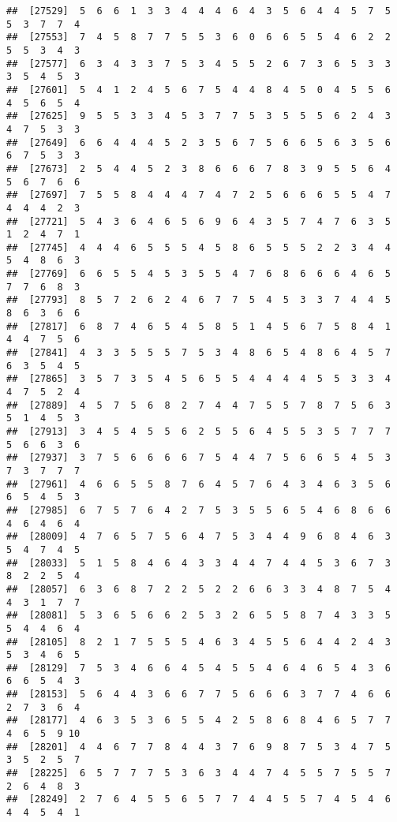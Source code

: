\documentclass[
]{book}
\begin{document}
\begin{verbatim}
##  [27529]  5  6  6  1  3  3  4  4  4  6  4  3  5  6  4  4  5  7  5  5  3  7  7  4
##  [27553]  7  4  5  8  7  7  5  5  3  6  0  6  6  5  5  4  6  2  2  5  5  3  4  3
##  [27577]  6  3  4  3  3  7  5  3  4  5  5  2  6  7  3  6  5  3  3  3  5  4  5  3
##  [27601]  5  4  1  2  4  5  6  7  5  4  4  8  4  5  0  4  5  5  6  4  5  6  5  4
##  [27625]  9  5  5  3  3  4  5  3  7  7  5  3  5  5  5  6  2  4  3  4  7  5  3  3
##  [27649]  6  6  4  4  4  5  2  3  5  6  7  5  6  6  5  6  3  5  6  6  7  5  3  3
##  [27673]  2  5  4  4  5  2  3  8  6  6  6  7  8  3  9  5  5  6  4  5  6  7  6  6
##  [27697]  7  5  5  8  4  4  4  7  4  7  2  5  6  6  6  5  5  4  7  4  4  4  2  3
##  [27721]  5  4  3  6  4  6  5  6  9  6  4  3  5  7  4  7  6  3  5  1  2  4  7  1
##  [27745]  4  4  4  6  5  5  5  4  5  8  6  5  5  5  2  2  3  4  4  5  4  8  6  3
##  [27769]  6  6  5  5  4  5  3  5  5  4  7  6  8  6  6  6  4  6  5  7  7  6  8  3
##  [27793]  8  5  7  2  6  2  4  6  7  7  5  4  5  3  3  7  4  4  5  8  6  3  6  6
##  [27817]  6  8  7  4  6  5  4  5  8  5  1  4  5  6  7  5  8  4  1  4  4  7  5  6
##  [27841]  4  3  3  5  5  5  7  5  3  4  8  6  5  4  8  6  4  5  7  6  3  5  4  5
##  [27865]  3  5  7  3  5  4  5  6  5  5  4  4  4  4  5  5  3  3  4  4  7  5  2  4
##  [27889]  4  5  7  5  6  8  2  7  4  4  7  5  5  7  8  7  5  6  3  5  1  4  5  3
##  [27913]  3  4  5  4  5  5  6  2  5  5  6  4  5  5  3  5  7  7  7  5  6  6  3  6
##  [27937]  3  7  5  6  6  6  6  7  5  4  4  7  5  6  6  5  4  5  3  7  3  7  7  7
##  [27961]  4  6  6  5  5  8  7  6  4  5  7  6  4  3  4  6  3  5  6  6  5  4  5  3
##  [27985]  6  7  5  7  6  4  2  7  5  3  5  5  6  5  4  6  8  6  6  4  6  4  6  4
##  [28009]  4  7  6  5  7  5  6  4  7  5  3  4  4  9  6  8  4  6  3  5  4  7  4  5
##  [28033]  5  1  5  8  4  6  4  3  3  4  4  7  4  4  5  3  6  7  3  8  2  2  5  4
##  [28057]  6  3  6  8  7  2  2  5  2  2  6  6  3  3  4  8  7  5  4  4  3  1  7  7
##  [28081]  5  3  6  5  6  6  2  5  3  2  6  5  5  8  7  4  3  3  5  5  4  4  6  4
##  [28105]  8  2  1  7  5  5  5  4  6  3  4  5  5  6  4  4  2  4  3  5  3  4  6  5
##  [28129]  7  5  3  4  6  6  4  5  4  5  5  4  6  4  6  5  4  3  6  6  6  5  4  3
##  [28153]  5  6  4  4  3  6  6  7  7  5  6  6  6  3  7  7  4  6  6  2  7  3  6  4
##  [28177]  4  6  3  5  3  6  5  5  4  2  5  8  6  8  4  6  5  7  7  4  6  5  9 10
##  [28201]  4  4  6  7  7  8  4  4  3  7  6  9  8  7  5  3  4  7  5  3  5  2  5  7
##  [28225]  6  5  7  7  7  5  3  6  3  4  4  7  4  5  5  7  5  5  7  2  6  4  8  3
##  [28249]  2  7  6  4  5  5  6  5  7  7  4  4  5  5  7  4  5  4  6  4  4  5  4  1

\end{verbatim}
\end{document}
